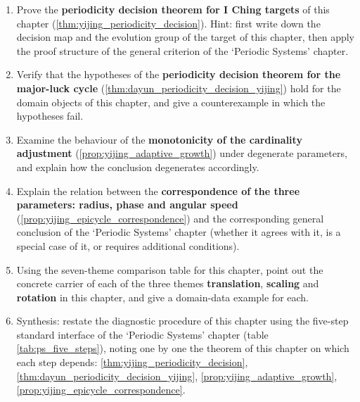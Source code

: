 \begin{enumerate}[leftmargin=3em, label=\textbf{Exercise \arabic*}]
    \item Prove the \textbf{periodicity decision theorem for I Ching targets} of this chapter (\ref{thm:yijing_periodicity_decision}). Hint: first write down the decision map and the evolution group of the target of this chapter, then apply the proof structure of the general criterion of the `Periodic Systems' chapter.

    \item Verify that the hypotheses of the \textbf{periodicity decision theorem for the major-luck cycle} (\ref{thm:dayun_periodicity_decision_yijing}) hold for the domain objects of this chapter, and give a counterexample in which the hypotheses fail.

    \item Examine the behaviour of the \textbf{monotonicity of the cardinality adjustment} (\ref{prop:yijing_adaptive_growth}) under degenerate parameters, and explain how the conclusion degenerates accordingly.

    \item Explain the relation between the \textbf{correspondence of the three parameters: radius, phase and angular speed} (\ref{prop:yijing_epicycle_correspondence}) and the corresponding general conclusion of the `Periodic Systems' chapter (whether it agrees with it, is a special case of it, or requires additional conditions).

    \item Using the seven-theme comparison table for this chapter, point out the concrete carrier of each of the three themes \textbf{translation}, \textbf{scaling} and \textbf{rotation} in this chapter, and give a domain-data example for each.

    \item Synthesis: restate the diagnostic procedure of this chapter using the five-step standard interface of the `Periodic Systems' chapter (table \ref{tab:ps_five_steps}), noting one by one the theorem of this chapter on which each step depends: \ref{thm:yijing_periodicity_decision}, \ref{thm:dayun_periodicity_decision_yijing}, \ref{prop:yijing_adaptive_growth}, \ref{prop:yijing_epicycle_correspondence}.
\end{enumerate}


